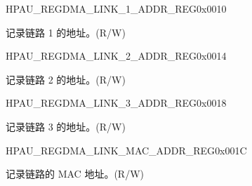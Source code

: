 \begin{register}{H}{PAU\_REGDMA\_LINK\_1\_ADDR\_REG}{0x0010}\label{regdesc:PAUREGDMALINK1ADDRREG}
%
\regnewline%
\begin{regdesc}\begin{reglist}
\label{fielddesc:PAULINKADDR1}\item [PAU\_LINK\_ADDR\_1] 记录链路 1 的地址。(R/W)
\end{reglist}\end{regdesc}
\end{register}


\begin{register}{H}{PAU\_REGDMA\_LINK\_2\_ADDR\_REG}{0x0014}\label{regdesc:PAUREGDMALINK2ADDRREG}
%
\regnewline%
\begin{regdesc}\begin{reglist}
\label{fielddesc:PAULINKADDR2}\item [PAU\_LINK\_ADDR\_2] 记录链路 2 的地址。(R/W)
\end{reglist}\end{regdesc}
\end{register}


\begin{register}{H}{PAU\_REGDMA\_LINK\_3\_ADDR\_REG}{0x0018}\label{regdesc:PAUREGDMALINK3ADDRREG}
%
\regnewline%
\begin{regdesc}\begin{reglist}
\label{fielddesc:PAULINKADDR3}\item [PAU\_LINK\_ADDR\_3] 记录链路 3 的地址。(R/W)
\end{reglist}\end{regdesc}
\end{register}


\begin{register}{H}{PAU\_REGDMA\_LINK\_MAC\_ADDR\_REG}{0x001C}\label{regdesc:PAUREGDMALINKMACADDRREG}
%
\regnewline%
\begin{regdesc}\begin{reglist}
\label{fielddesc:PAULINKADDRMAC}\item [PAU\_LINK\_ADDR\_MAC] 记录链路的 MAC 地址。(R/W)
\end{reglist}\end{regdesc}
\end{register}


